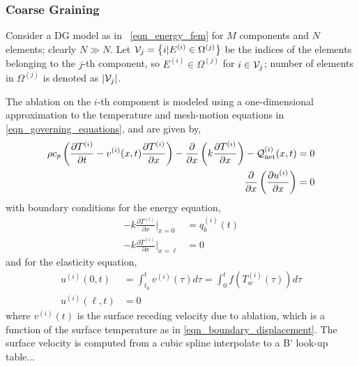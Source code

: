 \subsubsection{Coarse Graining}

Consider a DG model as in ~\cref{eqn_energy_fem} for $M$ components and $N$ elements; clearly $N\gg N$. Let $\mathcal{V}_j=\left\{i | E^{(i)}\in\Omega^{(j)}\right\}$ be the indices of the elements belonging to the $j$-th component, so $E^{(i)}\in\Omega^{(j)}$ for $i\in\mathcal{V}_j$; number of elements in $\Omega^{(j)}$ is denoted as $\left|\mathcal{V}_j\right|$.



The ablation on the $i$-th component is modeled using a one-dimensional approximation to the temperature and mesh-motion equations in \cref{eqn_governing_equations}, and are given by,
\begin{subequations}
    \begin{align}
        \rho c_p\left(\frac{\partial T^{(i)}}{\partial t} - v^{(i)}(x,t)\frac{\partial T^{(i)}}{\partial x}\right) - \frac{\partial}{\partial x}\left(k\frac{\partial T^{(i)}}{\partial x}\right) - \mathcal{Q}^{(i)}_{\text{net}}(x,t) &= 0\label{eqn_thermal_1d}\\
        \frac{\partial}{\partial x}\left(\frac{\partial u^{(i)}}{\partial x}\right) &= 0\label{eqn_elasticity_1d}
    \end{align}\label{eqn_rpm}
\end{subequations}
with boundary conditions for the energy equation,
\begin{subequations}
    \begin{align}
        -k\frac{\partial T^{(i)}}{\partial x}\Bigg|_{x=0} &= q^{(i)}_b(t)\\
        -k\frac{\partial T^{(i)}}{\partial x}\Bigg|_{x=\ell} &= 0
    \end{align}
\end{subequations}
and for the elasticity equation,
\begin{subequations}
    \begin{align}
        u^{(i)}(0,t) &= \int_{t_0}^{t}v^{(i)}(\tau)d\tau = \int_{0}^{t} f(T^{(i)}_w(\tau))d\tau\\
        u^{(i)}(\ell,t) &= 0
    \end{align}
\end{subequations}
where $v^{(i)}(t)$ is the surface receding velocity due to ablation, which is a function of the surface temperature as in \cref{eqn_boundary_displacement}. The surface velocity is computed from a cubic spline interpolate to a B' look-up table...



